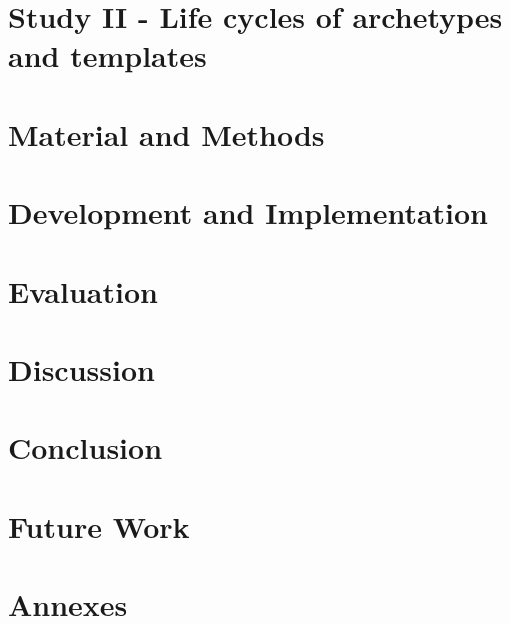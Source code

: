 \documentclass[a4paper, twoside, openright]{report}
\begin{document}
\chapter{Study II - Life cycles of archetypes and templates}


\chapter{Material and Methods}


\chapter{Development and Implementation}


\chapter{Evaluation}


\chapter{Discussion}


\chapter{Conclusion}


\chapter{Future Work}





\chapter{Annexes}


\backCover{}
\end{document}

